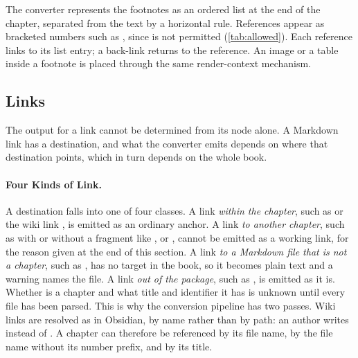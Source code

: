 The converter represents the footnotes as an ordered list at the end of the chapter, separated
from the text by a horizontal rule.
References appear as bracketed numbers such as \code{[1]}, since  is not permitted
(\autoref{tab:allowed}).
Each reference links to its list entry; a back-link returns to the reference.
An image or a table inside a footnote is placed through the same render-context mechanism.

\subsection{Links}
\label{sec:rf_anchors}

The output for a link cannot be determined from its node alone.
A Markdown link has a destination, and what the converter emits depends on where that destination
points, which in turn depends on the whole book.

\paragraph{Four Kinds of Link.}
A destination falls into one of four classes.
 A link \emph{within the chapter}, such as  or the wiki
link \code{[[\#Summary]]}, is emitted as an ordinary anchor.
 A link \emph{to another chapter}, such as  with or without a
fragment like , or \code{[[Setup]]}, cannot be emitted as a working link, for the
reason given at the end of this section.
 A link \emph{to a Markdown file that is not a chapter}, such as
, has no target in the book, so it becomes plain text and a warning names
the file.
 A link \emph{out of the package}, such as , is emitted as
it is.
Whether  is a chapter and what title and identifier it has is unknown until
every file has been parsed.
This is why the conversion pipeline has two passes.
Wiki links are resolved as in Obsidian, by name rather than by path: an author writes
\code{[[Setup]]} instead of \code{[[2\_Setup.md]]}.
A chapter can therefore be referenced by its file name, by the file name without its number prefix,
and by its title.

